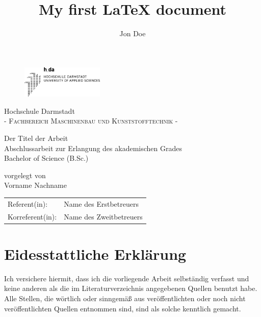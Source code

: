 \documentclass[a4paper,12pt]{article}
\title{My first \LaTeX{} document}
\author{Jon Doe}
\begin{document}
\newpage\null\thispagestyle{empty}\newpage
\newpage
\pagestyle{empty}

\begin{figure}[t]
	\centering
	\includegraphics[width=0.35\textwidth]{fig/Logo/logo-h-da.eps}
\end{figure}

\vfill

\begin{center}
\Large Hochschule Darmstadt \\
\normalsize \textsc{- Fachbereich Maschinenbau und Kunststofftechnik -} \\

\vfill

\Huge Der Titel der Arbeit \\
\normalsize
\vspace{12pt}
Abschlussarbeit zur Erlangung des akademischen Grades \\ 
Bachelor of Science (B.Sc.)

\vfill

vorgelegt von \\
Vorname Nachname

\vfill

\begin{tabular}[h]{p{4cm}l}
	Referent(in): & Name des Erstbetreuers\\
	Korreferent(in):  & Name des Zweitbetreuers \\
\end{tabular}

\end{center}

\newpage
\pagestyle{plain}
\section*{Eidesstattliche Erklärung}
Ich versichere hiermit, dass ich die vorliegende Arbeit selbständig verfasst und keine
anderen als die im Literaturverzeichnis angegebenen Quellen benutzt habe. \\

\noindent Alle Stellen, die wörtlich oder sinngemäß aus veröffentlichten oder noch nicht veröffentlichten Quellen entnommen sind, sind als solche kenntlich gemacht. \\
\end{document}
